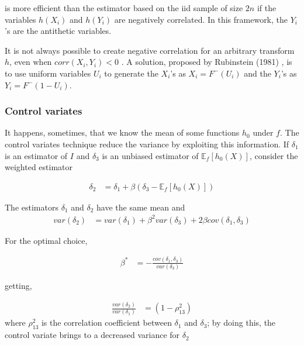 \documentclass[paper=a4, fontsize=12pt]{scrartcl} %
\numberwithin{equation}{section}
\begin{document}
is more efficient than the estimator based on the iid sample of size $2n$ if the variables $h(X_i)$ and $h(Y_i)$ are negatively correlated. In this framework, the $Y_i$'s are the antithetic variables. \par
It is not always possible to create negative correlation for an arbitrary transform $h$, even when $corr(X_i,Y_i) < 0$ . A solution, proposed by Rubinstein (1981) \cite{rubinstein81}, is to use uniform variables $U_i$ to generate the $X_i$'s as $X_i = F^-(U_i)$ and the $Y_i$'s as $Y_i = F^-(1-U_i)$.






\subsubsection{Control variates}
It happens, sometimes, that we know the mean of some functions $h_0$ under $f$. The control variates technique reduce the variance by exploiting this information. If $\delta_1$ is an estimator of $I$ and $\delta_3$ is an unbiased estimator of $\mathbb{E}_f [h_0(X)]$, consider the weighted estimator

		\begin{equation}	
		\begin{aligned}
			\delta_2 &= \delta_1 + \beta(\delta_3 - \mathbb{E}_f [h_0(X)])
		\end{aligned}
		\end{equation}
		
The estimators $\delta_1$ and $\delta_2$ have the same mean and
		\begin{equation}	
		\begin{aligned}
			var(\delta_2) &= var(\delta_1) + \beta^2var(\delta_3) + 2\beta cov(\delta_1, \delta_3)
		\end{aligned}
		\end{equation}

For the optimal choice,

		\begin{equation}	
		\begin{aligned}
			\beta^* &= -\frac{cov(\delta_1, \delta_3)}{var(\delta_3)}
		\end{aligned}
		\end{equation}
		
getting, 

		\begin{equation}	
		\begin{aligned}
			\frac{var(\delta_2)}{var(\delta_1)} &= (1-\rho_{13}^2)
		\end{aligned}
		\end{equation}
where $\rho_{13}^2$ is the correlation coefficient between $\delta_1$ and $\delta_3$; by doing this, the control variate brings to a decreased variance for $\delta_2$
\end{document}
